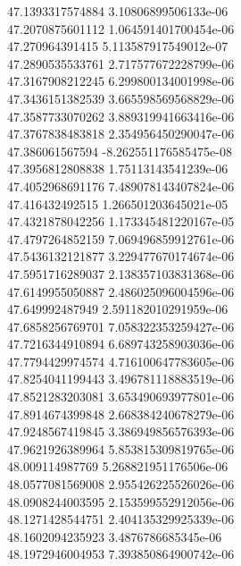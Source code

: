 {47.1393317574884 3.10806899506133e-06 \\
47.2070875601112 1.064591401700454e-06 \\
47.270964391415 5.113587917549012e-07 \\
47.2890535533761 2.717577672228799e-06 \\
47.3167908212245 6.299800134001998e-06 \\
47.3436151382539 3.665598569568829e-06 \\
47.3587733070262 3.889319941663416e-06 \\
47.3767838483818 2.354956450290047e-06 \\
47.386061567594 -8.262551176585475e-08 \\
47.3956812808838 1.75113143541239e-06 \\
47.4052968691176 7.489078143407824e-06 \\
47.416432492515 1.266501203645021e-05 \\
47.4321878042256 1.173345481220167e-05 \\
47.4797264852159 7.069496859912761e-06 \\
47.5436132121877 3.229477670174674e-06 \\
47.5951716289037 2.138357103831368e-06 \\
47.6149955050887 2.486025096004596e-06 \\
47.649992487949 2.591182010291959e-06 \\
47.6858256769701 7.058322353259427e-06 \\
47.7216344910894 6.689743258903036e-06 \\
47.7794429974574 4.716100647783605e-06 \\
47.8254041199443 3.496781118883519e-06 \\
47.8521283203081 3.653490693977801e-06 \\
47.8914674399848 2.668384240678279e-06 \\
47.9248567419845 3.386949856576393e-06 \\
47.9621926389964 5.853815309819765e-06 \\
48.009114987769 5.268821951176506e-06 \\
48.0577081569008 2.955426225526026e-06 \\
48.0908244003595 2.153599552912056e-06 \\
48.1271428544751 2.404135329925339e-06 \\
48.1602094235923 3.4876786685345e-06 \\
48.1972946004953 7.393850864900742e-06 \\
}
